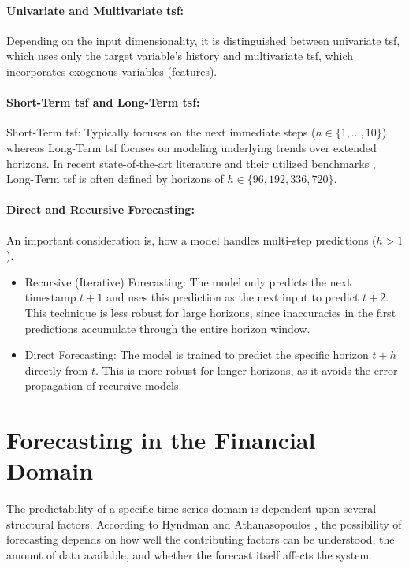 \documentclass[12pt,twoside=false,a4paper,parskip]{scrbook}
\begin{document}
\paragraph{Univariate and Multivariate \gls{tsf}:}

Depending on the input dimensionality, it is distinguished between univariate \gls{tsf}, which uses only the target variable's history and multivariate \gls{tsf}, which incorporates exogenous variables (features).


\paragraph{Short-Term \gls{tsf} and Long-Term \gls{tsf}:}

Short-Term \gls{tsf}: Typically focuses on the next immediate steps ($h \in \{1,\dots, 10\}$) whereas Long-Term \gls{tsf} focuses on modeling underlying trends over extended horizons. In recent state-of-the-art literature and their utilized benchmarks \cite{nie2023timeseriesworth64}, Long-Term \gls{tsf} is often defined by horizons of $h \in \{96, 192, 336, 720\}$.

\paragraph{Direct and Recursive Forecasting:}
An important consideration is, how a model handles multi-step predictions ($h > 1$).
\begin{itemize}
    \item Recursive (Iterative) Forecasting: The model only predicts the next timestamp $t+1$ and uses this prediction as the next input to predict $t+2$. This technique is less robust for large horizons, since inaccuracies in the first predictions accumulate through the entire horizon window.
    \item Direct Forecasting: The model is trained to predict the specific horizon $t+h$ directly from $t$. This is more robust for longer horizons, as it avoids the error propagation of recursive models. 
\end{itemize}

\section{Forecasting in the Financial Domain}
The predictability of a specific time-series domain is dependent upon several structural factors. According to Hyndman and Athanasopoulos \cite{hyndman2021forecasting_principles}, the possibility of forecasting depends on how well the contributing factors can be understood, the amount of data available, and whether the forecast itself affects the system.
\end{document}
